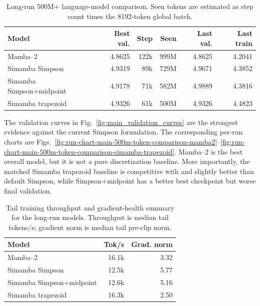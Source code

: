 \documentclass[conference]{IEEEtran}
\newcommand{\modelname}{Simamba\xspace}
\newcommand{\mambatwo}{Mamba--2\xspace}
\begin{document}
\begin{table}[t]
\caption{Long-run 500M+ language-model comparison. Seen tokens are estimated as step count times the 8192-token global batch.}
\label{tab:main}
\centering
\scriptsize
\begin{tabular}{@{}lrrrrr@{}}
\toprule
Model & Best val. & Step & Seen & Last val. & Last train\\
\midrule
\mambatwo & 4.8625 & 122k & 999M & 4.8625 & 4.2041\\
\modelname{} Simpson & 4.9319 & 89k & 729M & 4.9671 & 4.3852\\
\modelname{} Simpson+midpoint & 4.9178 & 71k & 582M & 4.9889 & 4.3816\\
\modelname{} trapezoid & 4.9326 & 61k & 500M & 4.9326 & 4.4823\\
\bottomrule
\end{tabular}
\end{table}

The validation curves in Fig.~\ref{fig:main_validation_curves} are the strongest evidence against the current Simpson formulation. The corresponding per-run charts are Figs.~\ref{fig:run-chart-main-500m-token-comparison-mamba2}--\ref{fig:run-chart-main-500m-token-comparison-simamba-trapezoid}. \mambatwo is the best overall model, but it is not a pure discretization baseline. More importantly, the matched \modelname trapezoid baseline is competitive with and slightly better than default Simpson, while Simpson+midpoint has a better best checkpoint but worse final validation.

\begin{table}[t]
\caption{Tail training throughput and gradient-health summary for the long-run models. Throughput is median tail tokens/s; gradient norm is median tail pre-clip norm.}
\label{tab:train_health}
\centering
\footnotesize
\begin{tabular}{@{}lrr@{}}
\toprule
Model & Tok/s & Grad. norm\\
\midrule
\mambatwo & 16.1k & 3.32\\
\modelname{} Simpson & 12.5k & 5.77\\
\modelname{} Simpson+midpoint & 12.6k & 5.16\\
\modelname{} trapezoid & 16.3k & 2.50\\
\bottomrule
\end{tabular}
\end{table}
\end{document}
